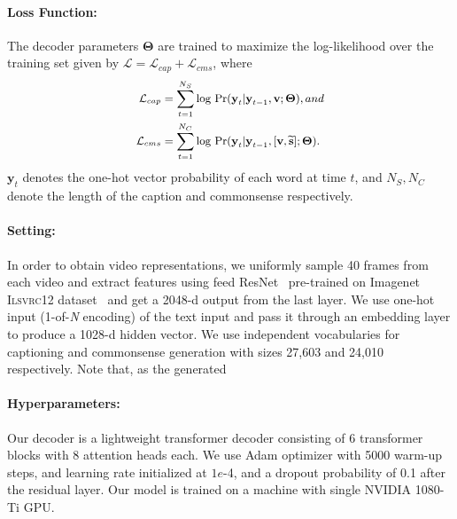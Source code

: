     \paragraph{Loss Function:}
    The decoder parameters $\mathbf{\Theta}$ are trained to maximize the log-likelihood over the training set given by
    $\mathcal{L} = \mathcal{L}_{cap} + \mathcal{L}_{cms}$, where
    \begin{equation}
        \small
        \begin{split}
            \mathcal{L}_{cap}   &= \sum_{t=1}^{N_S}\textrm{log Pr}(\textbf{y}_t| \textbf{y}_{t-1}, \mathbf{v}; \mathbf{\Theta}), and\\
            \mathcal{L}_{cms}   &= \sum_{t=1}^{N_C}\textrm{log}\textrm{ Pr}(\textbf{y}_t|\textbf{y}_{t-1}, [\mathbf{v}, \widetilde{\mathbf{s}}]; \mathbf{\Theta}).
        \end{split}
    \end{equation}
    $\textbf{y}_{t}$ denotes the one-hot vector probability of each word at time $t$, and $N_S, N_C$ denote the length of the caption and commonsense respectively.

 
           
    \paragraph{Setting:} 
    In order to obtain video representations, we uniformly sample 40 frames from each video and extract features using feed ResNet~\cite{he2016deep} pre-trained on Imagenet I\textsc{lsvrc}12 dataset~\cite{deng2009imagenet} and get a 2048-d output from the last layer. 
    We use one-hot input (1-of-\textit{N} encoding) of the text input and pass it through an embedding layer to produce a 1028-d hidden vector. 
    We use independent vocabularies for captioning and commonsense generation with sizes 27,603 and 24,010 respectively. Note that, as the generated 

    \paragraph{Hyperparameters:}
    Our decoder is a lightweight transformer decoder consisting of 6 transformer blocks with 8 attention heads each. 
    We use Adam optimizer with 5000 warm-up steps, and learning rate initialized at $1e$-4, and a dropout probability of 0.1 after the residual layer. 
    Our model is trained on a machine with single NVIDIA 1080-Ti GPU.
    
